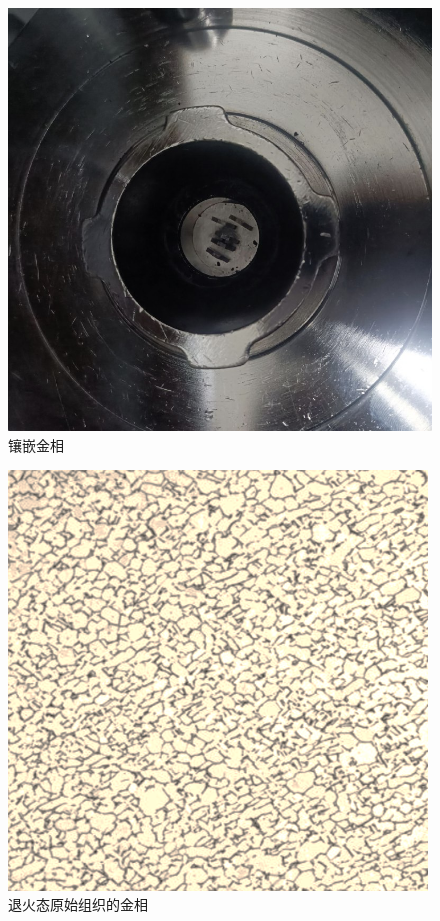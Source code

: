 \begin{figure}[htbp]
{\begin{minipage}[t]{0.33\linewidth}
			\includegraphics[width=0.8\linewidth]{pic/镶样过程}
		\end{minipage}%
	}%
	\centering
	\caption{镶嵌金相}
\end{figure}

\begin{figure}[h!]
	\centering
	\includegraphics[width=0.3\linewidth]{pic/组织分析/原始组织}
	\caption{退火态原始组织的金相}
	\label{fig:zero}
\end{figure}

